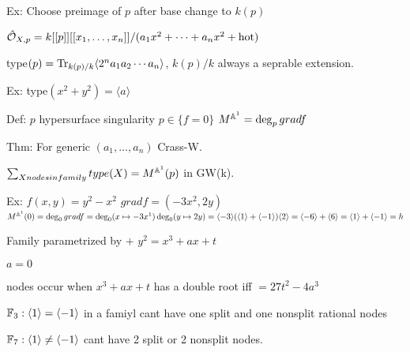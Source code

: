 Ex: Choose preimage of $p$ after base change to $k(p)$

$\hat{\mathcal{O}}_{X,p}= k[[p]][[x_1,\ldots,x_n]]/(a_1x^2+\cdots+a_nx^2+ \text{hot})$

type$(p)= \operatorname{Tr}_{k(p)/k} \langle 2^na_1a_2\cdots a_n \rangle$, $k(p)/k$ always a seprable extension. 



Ex: type$(x^2+y^2)= \langle a \rangle$

Def: $p$ hypersurface singularity $p \in \{f=0\}$
$M^{\mathbb{A}^1}= \deg_p grad f$

Thm: For generic $(a_1,\ldots,a_n)$ Crass-W.

$\sum_{X nodes in family} type (X)= M^{\mathbb{A}^1}(p)$ in GW(k).


Ex: $f(x,y)= y^2 - x^2$
$grad f= (-3x^2,2y)$
$M^{\mathbb{A}^1}(0)= \deg_0 grad f= \deg_0 (x \mapsto -3x^1) \deg_0(y \mapsto 2y)= \langle -3 \rangle ( \langle 1 \rangle + \langle -1 \rangle) \langle 2 \rangle= \langle -6 \rangle + \langle 6 \rangle= \langle 1 \rangle + \langle -1 \rangle = h$

Family parametrized by $+$
$y^2= x^3+ax+t$

$a=0$

nodes occur when $x^3+ax+t$ has a double root iff $=27t^2-4a^3$

$\mathbb{F}_3: \langle 1 \rangle= \langle -1 \rangle$ in a famiyl cant have one split and one nonsplit rational nodes

$\mathbb{F}_7: \langle 1 \rangle \neq \langle -1 \rangle$ cant have 2 split or 2 nonsplit nodes. 


























